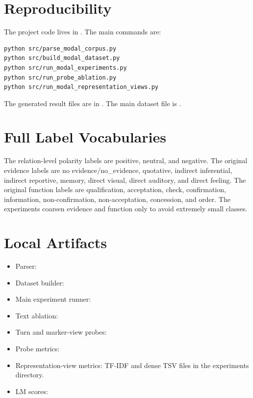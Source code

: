 \documentclass{article}
\begin{document}
\section{Reproducibility}

The project code lives in . The main commands are:
\begin{verbatim}
python src/parse_modal_corpus.py
python src/build_modal_dataset.py
python src/run_modal_experiments.py
python src/run_probe_ablation.py
python src/run_modal_representation_views.py
\end{verbatim}
The generated result files are in . The main dataset file is .

\printbibliography

\newpage
\appendix

\section{Full Label Vocabularies}

The relation-level polarity labels are positive, neutral, and negative. The original evidence labels are no evidence/no\_evidence, quotative, indirect inferential, indirect reportive, memory, direct visual, direct auditory, and direct feeling. The original function labels are qualification, acceptation, check, confirmation, information, non-confirmation, non-acceptation, concession, and order. The experiments coarsen evidence and function only to avoid extremely small classes.

\section{Local Artifacts}

\begin{itemize}
    \item Parser: 
    \item Dataset builder: 
    \item Main experiment runner: 
    \item Text ablation: 
    \item Turn and marker-view probes: 
    \item Probe metrics: 
    \item Representation-view metrics: TF-IDF and dense TSV files in the experiments directory.
    \item LM scores: 
\end{itemize}
\end{document}

